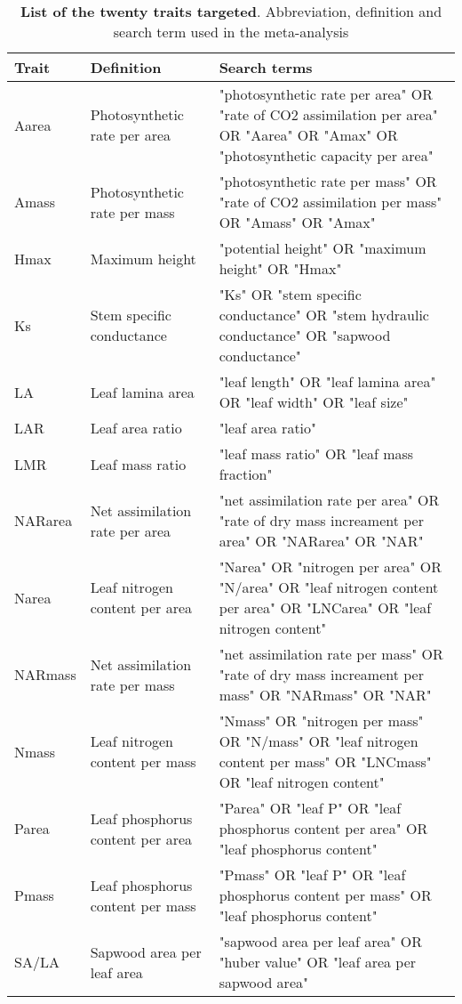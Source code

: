 \documentclass[a4paper]{article}\usepackage[]{graphicx}\usepackage[]{color}
\begin{document}
\begin{appendices}
\begin{table}[h!]
\centering
\caption{\textbf{List of the twenty traits targeted}. Abbreviation,
definition and search term used in the meta-analysis} 
\label{TableA1}
\vspace{0.5cm}
\begin{tabular}{p{3cm}p{3cm}p{8cm}}
  \hline
Trait & Definition & Search terms \\
  \hline
Aarea & Photosynthetic rate per area & "photosynthetic rate per area" OR "rate of CO2 assimilation per area" OR "Aarea" OR "Amax" OR "photosynthetic capacity per area" \\
  Amass & Photosynthetic rate per mass & "photosynthetic rate per mass" OR "rate of CO2 assimilation per mass" OR "Amass" OR "Amax" \\
  Hmax & Maximum height & "potential height" OR "maximum height" OR "Hmax" \\
  Ks & Stem specific conductance & "Ks" OR "stem specific conductance" OR "stem hydraulic conductance" OR "sapwood conductance" \\
  LA & Leaf lamina area & "leaf length" OR "leaf lamina area" OR "leaf width" OR "leaf size" \\
  LAR & Leaf area ratio & "leaf area ratio" \\
  LMR & Leaf mass ratio & "leaf mass ratio" OR "leaf mass fraction" \\
  NARarea & Net assimilation rate per area &  "net assimilation rate per area" OR "rate of dry mass increament per area" OR "NARarea" OR "NAR" \\
  Narea & Leaf nitrogen content per area & "Narea" OR "nitrogen per area" OR "N/area" OR "leaf nitrogen content per area" OR "LNCarea" OR "leaf nitrogen content" \\
  NARmass & Net assimilation rate per mass &  "net assimilation rate per mass" OR "rate of dry mass increament per mass" OR "NARmass" OR "NAR" \\
  Nmass & Leaf nitrogen content per mass & "Nmass" OR "nitrogen per mass" OR "N/mass" OR "leaf nitrogen content per mass" OR "LNCmass" OR "leaf nitrogen content" \\
  Parea & Leaf phosphorus content per area & "Parea" OR "leaf P" OR  "leaf phosphorus content per area"  OR "leaf phosphorus content" \\
  Pmass & Leaf phosphorus content per mass & "Pmass" OR "leaf P" OR  "leaf phosphorus content per mass" OR "leaf phosphorus content" \\
  SA/LA & Sapwood area per leaf area & "sapwood area per leaf area" OR "huber value" OR "leaf area per sapwood area" \\

\end{tabular}
\end{table}
\end{appendices}
\end{document}
